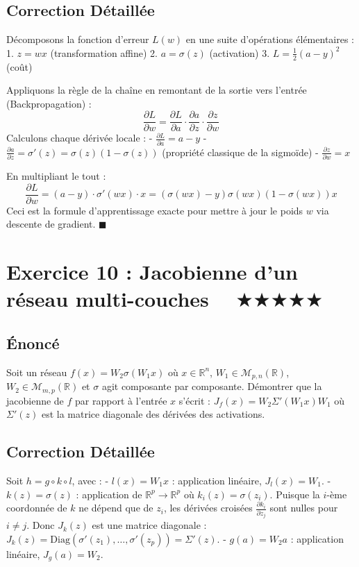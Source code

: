 \documentclass[11pt,a4paper]{article}
\begin{document}
\subsection*{Correction Détaillée}
Décomposons la fonction d'erreur $L(w)$ en une suite d'opérations élémentaires :
1. $z = wx$ (transformation affine)
2. $a = \sigma(z)$ (activation)
3. $L = \frac{1}{2} (a - y)^2$ (coût)

Appliquons la règle de la chaîne en remontant de la sortie vers l'entrée (Backpropagation) :
$$ \frac{\partial L}{\partial w} = \frac{\partial L}{\partial a} \cdot \frac{\partial a}{\partial z} \cdot \frac{\partial z}{\partial w} $$
Calculons chaque dérivée locale :
- $\frac{\partial L}{\partial a} = a - y$
- $\frac{\partial a}{\partial z} = \sigma'(z) = \sigma(z)(1 - \sigma(z))$ (propriété classique de la sigmoïde)
- $\frac{\partial z}{\partial w} = x$

En multipliant le tout :
$$ \frac{\partial L}{\partial w} = (a - y) \cdot \sigma'(wx) \cdot x = (\sigma(wx) - y) \sigma(wx)(1 - \sigma(wx)) x $$
Ceci est la formule d'apprentissage exacte pour mettre à jour le poids $w$ via descente de gradient.
$\blacksquare$

\newpage
\section*{Exercice 10 : Jacobienne d'un réseau multi-couches $\quad \bigstar\bigstar\bigstar\bigstar\bigstar$}
\subsection*{Énoncé}
Soit un réseau $f(x) = W_2 \sigma(W_1 x)$ où $x \in \mathbb{R}^n$, $W_1 \in \mathcal{M}_{p,n}(\mathbb{R})$, $W_2 \in \mathcal{M}_{m,p}(\mathbb{R})$ et $\sigma$ agit composante par composante.
Démontrer que la jacobienne de $f$ par rapport à l'entrée $x$ s'écrit :
$J_f(x) = W_2 \Sigma'(W_1 x) W_1$ où $\Sigma'(z)$ est la matrice diagonale des dérivées des activations.
\subsection*{Correction Détaillée}
Soit $h = g \circ k \circ l$, avec :
- $l(x) = W_1 x$ : application linéaire, $J_l(x) = W_1$.
- $k(z) = \sigma(z)$ : application de $\mathbb{R}^p \to \mathbb{R}^p$ où $k_i(z) = \sigma(z_i)$.
  Puisque la $i$-ème coordonnée de $k$ ne dépend que de $z_i$, les dérivées croisées $\frac{\partial k_i}{\partial z_j}$ sont nulles pour $i \neq j$.
  Donc $J_k(z)$ est une matrice diagonale : $J_k(z) = \mathrm{Diag}(\sigma'(z_1), \dots, \sigma'(z_p)) = \Sigma'(z)$.
- $g(a) = W_2 a$ : application linéaire, $J_g(a) = W_2$.
\end{document}
